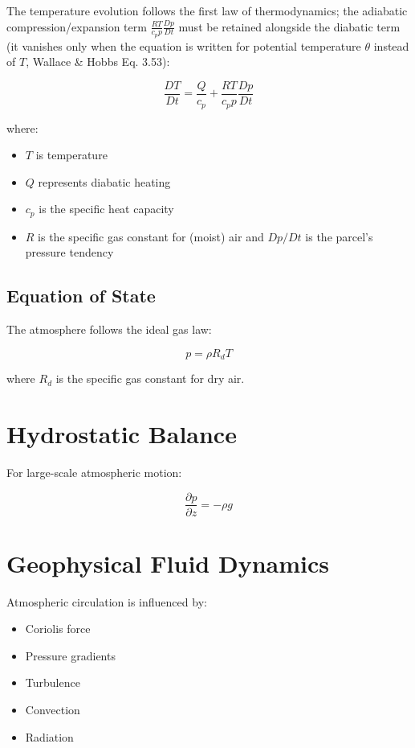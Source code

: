 The temperature evolution follows the first law of thermodynamics; the
adiabatic compression/expansion term $\frac{RT}{c_p p}\frac{Dp}{Dt}$ must be
retained alongside the diabatic term (it vanishes only when the equation is
written for potential temperature $\theta$ instead of $T$, Wallace \& Hobbs
Eq. 3.53):

\begin{equation}
\frac{DT}{Dt}
=
\frac{Q}{c_p}
+
\frac{RT}{c_p p}\frac{Dp}{Dt}
\end{equation}

where:

\begin{itemize}
\item $T$ is temperature
\item $Q$ represents diabatic heating
\item $c_p$ is the specific heat capacity
\item $R$ is the specific gas constant for (moist) air and $Dp/Dt$ is the
  parcel's pressure tendency
\end{itemize}



\subsection{Equation of State}

The atmosphere follows the ideal gas law:

\begin{equation}
p=\rho R_d T
\end{equation}

where $R_d$ is the specific gas constant for dry air.



\section{Hydrostatic Balance}

For large-scale atmospheric motion:

\begin{equation}
\frac{\partial p}{\partial z}
=
-\rho g
\end{equation}



\section{Geophysical Fluid Dynamics}

Atmospheric circulation is influenced by:

\begin{itemize}
\item Coriolis force
\item Pressure gradients
\item Turbulence
\item Convection
\item Radiation
\end{itemize}

